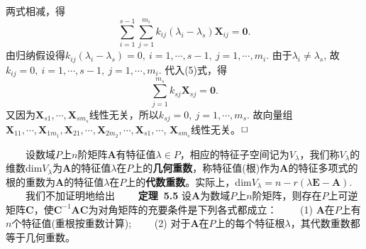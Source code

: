 \documentclass[compress,mathserif,cjk]{beamer}
\theoremstyle{remark}
\numberwithin{equation}{section}
\newcommand{\hei}{\bf}      %
\begin{document}
\begin{CJK}{UTF8}{gbsn}
\begin{frame}
\end{frame}

\begin{frame}
两式相减，得
$$\sum_{i=1}^{s-1}\sum_{j=1}^{m_i}k_{ij}(\lambda_i-\lambda_s)\bm X_{ij}=\bm0.$$
由归纳假设得$k_{ij}(\lambda_i-\lambda_s)=0,~i=1,\cdots,s-1,~j=1,\cdots,m_i$. 由于$\lambda_i\neq\lambda_s$, 故$k_{ij}=0,~i=1,\cdots,s-1,~j=1,\cdots,m_i$. 代入(5)式，得
$$\sum_{j=1}^{m_s}k_{sj}\bm X_{sj}=\bm0.$$
又因为$\bm X_{s1},\cdots,\bm X_{sm_s}$线性无关，所以$k_{sj}=0,~j=1,\cdots,m_s$. 故向量组$\bm X_{11},\cdots,\bm X_{1m_1},\bm X_{21},\cdots,\bm X_{2m_2},\cdots,\bm X_{s1},\cdots$, $\bm X_{sm_s}$线性无关。$\hfill\Box$
\end{frame}
\begin{frame}
\ \ \ \ 设数域$P$上$n$阶矩阵$\bm A$有特征值$\lambda\in P$，相应的特征子空间记为$V_\lambda$，我们称$V_\lambda$的维数dim$V_\lambda$为$\bm A$的特征值$\lambda$在$P$上的{\hei 几何重数}，\pause 称特征值(根)作为$\bm A$的特征多项式的根的重数为$\bm A$的特征值$\lambda$在$P$上的{\hei 代数重数}。实际上，dim$V_\lambda=n-r(\lambda\bm E-\bm A)$.
\pause\vskip 5pt
\ \ \ \ 我们不加证明地给出
\vskip 5pt
\ \ \ \ {\hei 定理~5.5} 设$\bm A$为数域$P$上$n$阶矩阵，则存在$P$上可逆矩阵$\bm C$，使$\bm C^{-1}\bm{AC}$为对角矩阵的充要条件是下列各式都成立：
\vskip 5pt
\ \ \ \ (1) $\bm A$在$P$上有$n$个特征值(重根按重数计算);
\vskip 5pt
\ \ \ \ (2) 对于$\bm A$在$P$上的每个特征根$\lambda$，其代数重数都等于几何重数。
\end{frame}


\end{CJK}
\end{document}
